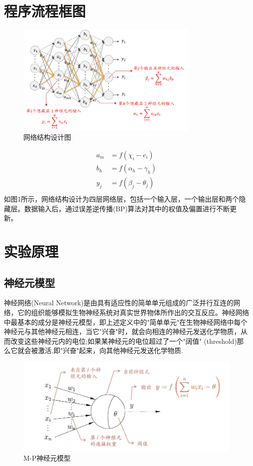 \documentclass{progartcn}
\begin{document}
\section{程序流程框图}

\begin{figure}[H]
	\centering
	\includegraphics[width=0.8\textwidth]{图片1.png}
	\caption{\centering  网络结构设计图}
\end{figure}
\begin{equation}
	\begin{aligned}
		a_m &= f(\chi_i-e_i) \\
		b_h &= f(\alpha_h - \gamma_h) \\
		y_j &= f(\beta_j - \theta_j) \\
	\end{aligned}
\end{equation}
如图1所示，网络结构设计为四层网络层，包括一个输入层，一个输出层和两个隐藏层。数据输入后，通过误差逆传播(BP)算法对其中的权值及偏置进行不断更新。

\section{实验原理}
\subsection{神经元模型}
神经网络(Neural Network)是由具有适应性的简单单元组成的广泛并行互连的网络，它的组织能够模拟生物神经系统对真实世界物体所作出的交互反应。神经网络中最基本的成分是神经元模型，即上述定义中的"简单单元"在生物神经网络中每个神经元与其他神经元相连，当它"兴奋"时，就会向相连的神经元发送化学物质，从而改变这些神经元内的电位;如果某神经元的电位超过了一个"阔值" (threshold)那么它就会被激活,即"兴奋"起来，向其他神经元发送化学物质.

\begin{figure}[H]
	\centering
	\includegraphics[width=0.7\linewidth]{screenshot001}
	\caption{\centering M-P神经元模型}
	\label{fig:screenshot001}
\end{figure}
\end{document}
